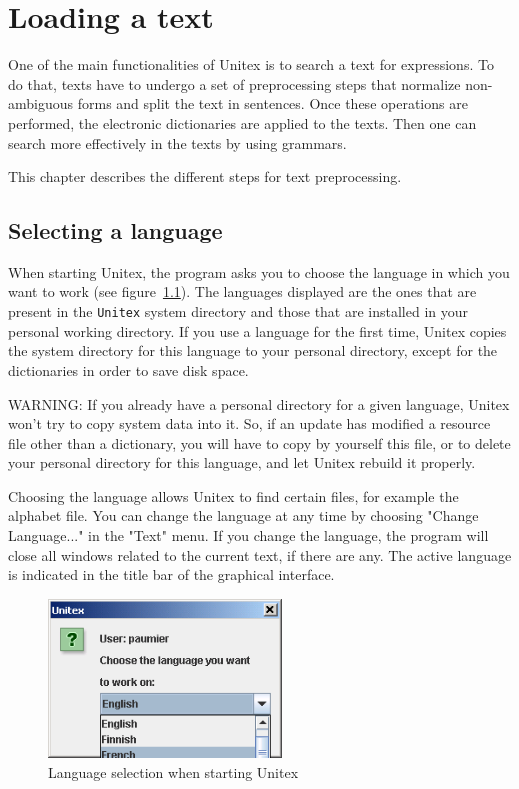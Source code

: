 \chapter{Loading a text}
\label{chap-text}

One of the main functionalities of Unitex is to search a text for expressions.
To do that, texts have to undergo a set of preprocessing steps that  normalize
non-ambiguous forms and split the text  in sentences. Once these operations are
performed, the electronic dictionaries are applied to the texts. Then one  can
search more effectively in the texts by using  grammars.

\bigskip
\noindent This chapter describes the different steps for text preprocessing.


\section{Selecting a language}
When starting Unitex, the program asks you to choose the language in which you
want to work (see figure~\ref{fig-language-selection}). The languages
displayed are the ones that are present in the \verb+Unitex+ system directory and those that
are  installed in your personal working directory. If you use a language for the
first time, Unitex copies the system directory for this language to your personal
directory, except for the dictionaries in order to save disk space.

\bigskip
\noindent WARNING: If
you already have a personal directory for a given language, Unitex won't try to
copy system data into it. So, if an update has modified a resource file other
than a dictionary, you will have to copy by yourself this file, or to delete your
personal directory for this language, and let Unitex rebuild it properly.

\bigskip
\noindent 
Choosing the language allows Unitex to find certain files, for example the
alphabet file.  You can change the language at any time by
choosing "Change Language..." in the "Text" menu. If you change the language, the
program will close all windows related to the current text, if there are any. The
active language is indicated in the title bar of the graphical interface.

\begin{figure}[!h]
\begin{center}
\includegraphics[width=6.2cm]{resources/img/fig2-1.png}
\caption{\label{fig-language-selection}Language selection when starting
Unitex}
\end{center}
\end{figure}


